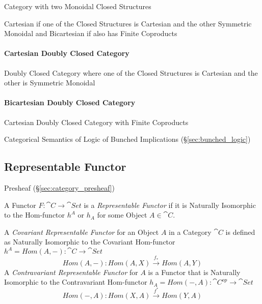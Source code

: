 Category with two Monoidal Closed Structures

Cartesian if one of the Closed Structures is Cartesian and the other
Symmetric Monoidal and Bicartesian if also has Finite Coproducts



\paragraph{Cartesian Doubly Closed Category}
\label{sec:cartesian_doubly_closed}\hfill

Doubly Closed Category where one of the Closed Structures is Cartesian
and the other is Symmetric Monoidal



\paragraph{Bicartesian Doubly Closed Category}
\label{sec:bicartesian_doubly_closed}\hfill

Cartesian Doubly Closed Category with Finite Coproducts

Categorical Semantics of Logic of Bunched Implications
(\S\ref{sec:bunched_logic})



\subsection{Representable Functor}\label{sec:representable_functor}

Presheaf (\S\ref{sec:category_presheaf})

A Functor $F : \cat{C} \rightarrow \cat{Set}$ is a
\emph{Representable Functor} if it is Naturally Isomorphic to the
Hom-functor $h^A$ or $h_A$ for some Object $A \in \cat{C}$.

A \emph{Covariant Representable Functor} for an Object $A$ in a
Category $\cat{C}$ is defined as Naturally Isomorphic to the
Covariant Hom-functor $h^A = Hom(A,-) : \cat{C} \rightarrow
\cat{Set}$
\[
  Hom(A,-) : Hom(A,X) \xrightarrow{f_*} Hom(A,Y)
\]
A \emph{Contravariant Representable Functor} for $A$ is a Functor that
is Naturally Isomorphic to the Contravariant Hom-functor $h_A =
Hom(-,A) : \cat{C^{op}} \rightarrow \cat{Set}$
\[
  Hom(-,A) : Hom(X,A) \xrightarrow{f^*} Hom(Y,A)
\]

